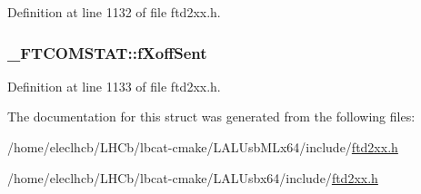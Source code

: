 Definition at line 1132 of file ftd2xx.h.\hypertarget{struct__FTCOMSTAT_a5a28cf3c2aea49110593931c78934416}{
\subsubsection[{fXoffSent}]{ {\bf \_\-FTCOMSTAT::fXoffSent}}}
\label{struct__FTCOMSTAT_a5a28cf3c2aea49110593931c78934416}


Definition at line 1133 of file ftd2xx.h.

The documentation for this struct was generated from the following files:\begin{DoxyCompactItemize}
\item 
/home/eleclhcb/LHCb/lbcat-\/cmake/LALUsbMLx64/include/\hyperlink{LALUsbMLx64_2include_2ftd2xx_8h}{ftd2xx.h}\item 
/home/eleclhcb/LHCb/lbcat-\/cmake/LALUsbx64/include/\hyperlink{LALUsbx64_2include_2ftd2xx_8h}{ftd2xx.h}\end{DoxyCompactItemize}
